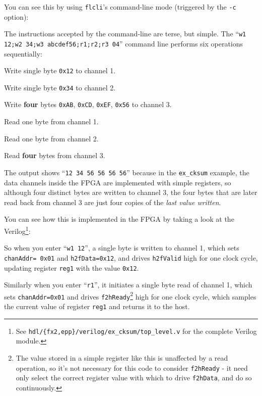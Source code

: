 You can see this by using \texttt{flcli}'s command-line mode (triggered by the \texttt{-c} option):


The instructions accepted by the command-line are terse, but simple. The ``\texttt{w1 12;w2 34;w3 abcdef56;r1;r2;r3 04}'' command line performs six operations sequentially:

\begin{blobs}
  \item Write single byte \texttt{0x12} to channel 1.
  \item Write single byte \texttt{0x34} to channel 2.
  \item Write \textbf{four} bytes \texttt{0xAB}, \texttt{0xCD}, \texttt{0xEF}, \texttt{0x56} to channel 3.
  \item Read one byte from channel 1.
  \item Read one byte from channel 2.
  \item Read \textbf{four} bytes from channel 3.
\end{blobs}

The output shows ``\texttt{12 34 56 56 56 56}'' because in the \texttt{ex\_cksum} example, the data channels inside the FPGA are implemented with simple registers, so although four distinct bytes are written to channel 3, the four bytes that are later read back from channel 3 are just four copies of the \textit{last value written}.

You can see how this is implemented in the FPGA by taking a look at the Verilog\footnote{See \texttt{hdl/\{fx2,epp\}/verilog/ex\_cksum/top\_level.v} for the complete Verilog module.}:


So when you enter ``\texttt{w1 12}'', a single byte is written to channel 1, which sets \texttt{chanAddr= 0x01} and \texttt{h2fData=0x12}, and drives \texttt{h2fValid} high for one clock cycle, updating register \texttt{reg1} with the value \texttt{0x12}.

Similarly when you enter ``\texttt{r1}'', it initiates a single byte read of channel 1, which sets \texttt{chanAddr=0x01} and drives \texttt{f2hReady}\footnote{The value stored in a simple register like this is unaffected by a read operation, so it's not necessary for this code to consider \texttt{f2hReady} - it need only select the correct register value with which to drive \texttt{f2hData}, and do so continuously.} high for one clock cycle, which samples the current value of register \texttt{reg1} and returns it to the host.

